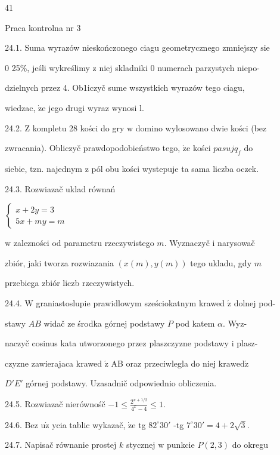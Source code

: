 \documentclass[a4paper,12pt]{article}
\begin{document}
41

Praca kontrolna nr 3

24.1. Suma wyrazów nieskończonego ciagu geometrycznego zmniejszy $\mathrm{s}\mathrm{i}\mathrm{e}$

$0$ 25\%, jeśli wykreślimy $\mathrm{z}$ niej skladniki $0$ numerach parzystych niepo-

dzielnych przez 4. Ob1iczyč sume wszystkich wyrazów tego ciagu,

wiedzac, $\dot{\mathrm{z}}\mathrm{e}$ jego drugi wyraz wynosi l.

24.2. $\mathrm{Z}$ kompletu 28 kości do gry $\mathrm{w}$ domino wylosowano dwie kości (bez

zwracania). Obliczyč prawdopodobieństwo tego, $\dot{\mathrm{z}}\mathrm{e}$ kości $pasujq_{f}$ do

siebie, $\mathrm{t}\mathrm{z}\mathrm{n}$. najednym $\mathrm{z}$ pól obu kości wystepuje ta sama liczba oczek.

24.3. Rozwiazač uklad równań

$\left\{\begin{array}{l}
x+2y=3\\
5x+my=m
\end{array}\right.$

$\mathrm{w}$ zalezności od parametru rzeczywistego $m$. Wyznaczyč $\mathrm{i}$ narysowač

zbiór, jaki tworza rozwiazania $(x(m),y(m))$ tego ukladu, gdy $m$

przebiega zbiór liczb rzeczywistych.

24.4. $\mathrm{W}$ graniastoslupie prawidlowym sześciokatnym krawed $\acute{\mathrm{z}}$ dolnej pod-

stawy $AB$ widač ze środka górnej podstawy $P$ pod katem $\alpha$. Wyz-

naczyč cosinus kata utworzonego przez plaszczyzne podstawy $\mathrm{i}$ plasz-

czyzne zawierajaca krawed $\acute{\mathrm{z}}$ AB oraz przeciwlegla do niej $\mathrm{k}\mathrm{r}\mathrm{a}\mathrm{w}\mathrm{e}\mathrm{d}\acute{\mathrm{z}}$

$D'E'$ górnej podstawy. Uzasadnič odpowiednio obliczenia.

24.5. Rozwiazač nierównośč $-1\displaystyle \leq\frac{2^{x+1/2}}{4^{x}-4}\leq 1.$

24.6. Bez $\mathrm{u}\dot{\mathrm{z}}$ ycia tablic wykazač, $\dot{\mathrm{z}}\mathrm{e}$ tg $82^{\circ}30'$ -tg $7^{\circ}30'=4+2\sqrt{3}.$

24.7. Napisač równanie prostej $k$ stycznej $\mathrm{w}$ punkcie $P(2,3)$ do okregu
\end{document}
